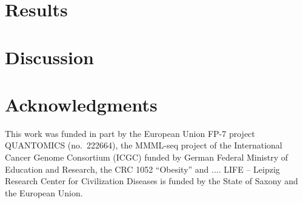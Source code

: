 \documentclass[preprint,3p,times,twocolumn]{elsarticle}
\newcommand{\TODO}[1] {\begingroup\color{red}#1\endgroup}
\begin{document}
\section{Results}


\section{Discussion}



\section*{Acknowledgments}

This work was funded in part by the European Union FP-7 project QUANTOMICS
(no.\ 222664), the MMML-seq project of the International Cancer Genome
Consortium (ICGC) funded by German Federal Ministry of Education and
Research, the CRC 1052 ``Obesity'' \TODO{ and ...}. LIFE -- Leipzig
Research Center for Civilization Diseases is funded by the State of Saxony
and the European Union.



\end{document}
